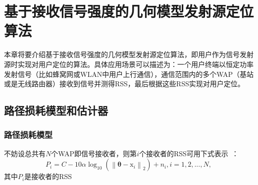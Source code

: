 \chapter{基于接收信号强度的几何模型发射源定位算法}
\label{cha:transmitter}

本章将要介绍基于接收信号强度的几何模型发射源定位算法，即用户作为信号发射源时实现对用户定位的算法。具体应用场景可以描述为：一个用户终端以恒定功率发射信号（比如蜂窝网或WLAN中用户上行通信），通信范围内的多个WAP（基站或是无线路由器）接收到信号并测得RSS，最后根据这些RSS实现对用户定位。

\section{路径损耗模型和估计器}

\subsection{路径损耗模型}

不妨设总共有$N$个WAP即信号接收者，则第$i$个接收者的RSS可用下式表示~\cite{erceg1999empirically}：
\begin{equation}
{P_i} = C - 10\alpha {\log _{10}}({\left\| {{\mathbf{\theta}} - {{\mathbf{\mathrm{x}}_i}}} \right\|_2}) + {n_i}, i = 1,2,...,N,\label{eq:rss}
\end{equation}
其中$P_i$是接收者的RSS



